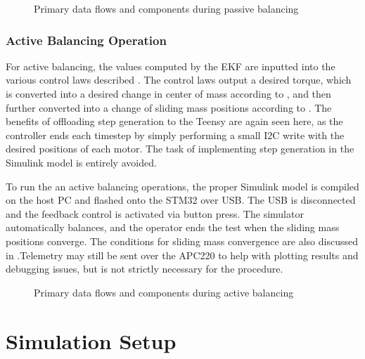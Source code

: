 \begin{figure}
    \centering
    
    \caption{Primary data flows and components during passive balancing}
    \label{fig:sys_arch_passive}
\end{figure}

\subsubsection{Active Balancing Operation}

For active balancing, the values computed by the EKF are inputted into the various control laws described . The control laws output a desired torque, which is converted into a desired change in center of mass according to , and then further converted into a change of sliding mass positions according to . The benefits of offloading step generation to the Teensy are again seen here, as the controller ends each timestep by simply performing a small I2C write with the desired positions of each motor. The task of implementing step generation in the Simulink model is entirely avoided. 

To run the an active balancing operations, the proper Simulink model is compiled on the host PC and flashed onto the STM32 over USB. The USB is disconnected and the feedback control is activated via button press. The simulator automatically balances, and the operator ends the test when the sliding mass positions converge. The conditions for sliding mass convergence are also discussed in .Telemetry may still be sent over the APC220 to help with plotting results and debugging issues, but is not strictly necessary for the procedure. 


\begin{figure}
    \centering
    
    \caption{Primary data flows and components during active balancing}
    \label{fig:sys_arch_active}
\end{figure}

\section{Simulation Setup}\label{sec:sim_setup}